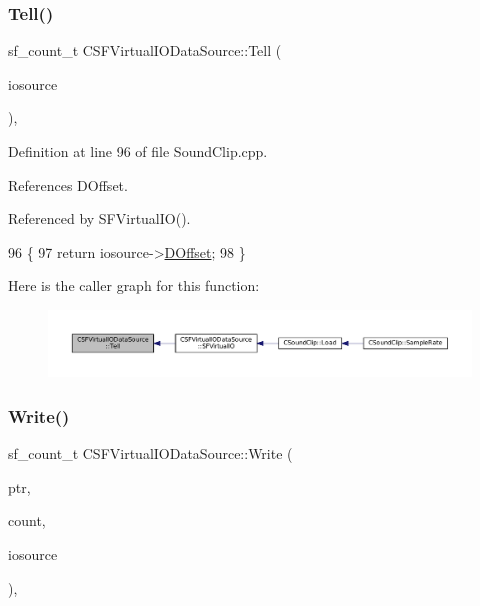 \subsubsection{\texorpdfstring{Tell()}{Tell()}}
{\footnotesize\ttfamily sf\+\_\+count\+\_\+t C\+S\+F\+Virtual\+I\+O\+Data\+Source\+::\+Tell (\begin{DoxyParamCaption}\item[{\hyperlink{classCSFVirtualIODataSource}{C\+S\+F\+Virtual\+I\+O\+Data\+Source} $\ast$}]{iosource }\end{DoxyParamCaption})\hspace{0.3cm}{\ttfamily [static]}, {\ttfamily [protected]}}



Definition at line 96 of file Sound\+Clip.\+cpp.



References D\+Offset.



Referenced by S\+F\+Virtual\+I\+O().


\begin{DoxyCode}
96                                                                        \{
97     \textcolor{keywordflow}{return} iosource->\hyperlink{classCSFVirtualIODataSource_a29db7bf8a3a7103deacb80bf619919c8}{DOffset};
98 \}
\end{DoxyCode}
Here is the caller graph for this function\+:\nopagebreak
\begin{figure}[H]
\begin{center}
\leavevmode
\includegraphics[width=350pt]{classCSFVirtualIODataSource_aae8e2b59f9753ed1f8baca1561b15962_icgraph}
\end{center}
\end{figure}
\hypertarget{classCSFVirtualIODataSource_ac1d38c4c9d8ba3e0a2affd7dd72283ee}{}\label{classCSFVirtualIODataSource_ac1d38c4c9d8ba3e0a2affd7dd72283ee} 
\subsubsection{\texorpdfstring{Write()}{Write()}}
{\footnotesize\ttfamily sf\+\_\+count\+\_\+t C\+S\+F\+Virtual\+I\+O\+Data\+Source\+::\+Write (\begin{DoxyParamCaption}\item[{const void $\ast$}]{ptr,  }\item[{sf\+\_\+count\+\_\+t}]{count,  }\item[{\hyperlink{classCSFVirtualIODataSource}{C\+S\+F\+Virtual\+I\+O\+Data\+Source} $\ast$}]{iosource }\end{DoxyParamCaption})\hspace{0.3cm}{\ttfamily [static]}, {\ttfamily [protected]}}



